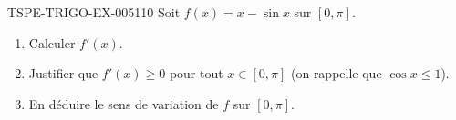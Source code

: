 \begin{exercice}{TSPE-TRIGO-EX-005}{1}{10}
Soit $f(x) = x - \sin x$ sur $[0, \pi]$.
\begin{enumerate}
  \item Calculer $f'(x)$.
  \item Justifier que $f'(x) \geq 0$ pour tout $x \in [0,\pi]$ (on rappelle que $\cos x \leq 1$).
  \item En déduire le sens de variation de $f$ sur $[0,\pi]$.
\end{enumerate}
\end{exercice}

